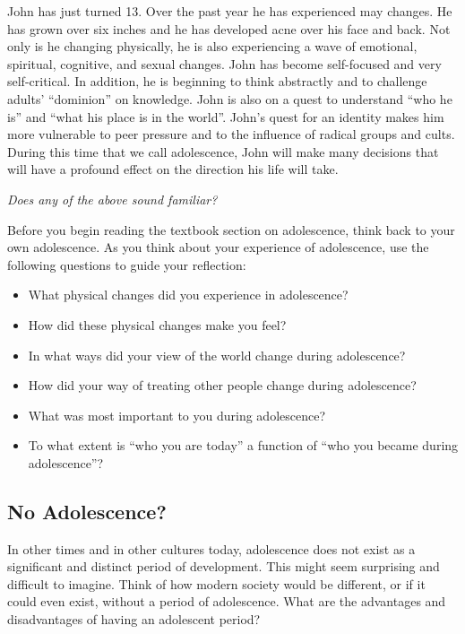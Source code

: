 \documentclass[
]{book}
\providecommand{\tightlist}{%
  \setlength{\itemsep}{0pt}\setlength{\parskip}{0pt}}
\begin{document}
John has just turned 13. Over the past year he has experienced may changes. He has grown over six inches and he has developed acne over his face and back. Not only is he changing physically, he is also experiencing a wave of emotional, spiritual, cognitive, and sexual changes. John has become self-focused and very self-critical. In addition, he is beginning to think abstractly and to challenge adults' ``dominion'' on knowledge. John is also on a quest to understand ``who he is'' and ``what his place is in the world''. John's quest for an identity makes him more vulnerable to peer pressure and to the influence of radical groups and cults. During this time that we call adolescence, John will make many decisions that will have a profound effect on the direction his life will take.

\emph{Does any of the above sound familiar?}

Before you begin reading the textbook section on adolescence, think back to your own adolescence. As you think about your experience of adolescence, use the following questions to guide your reflection:

\begin{itemize}
\tightlist
\item
  What physical changes did you experience in adolescence?\\
\item
  How did these physical changes make you feel?\\
\item
  In what ways did your view of the world change during adolescence?\\
\item
  How did your way of treating other people change during adolescence?\\
\item
  What was most important to you during adolescence?\\
\item
  To what extent is ``who you are today'' a function of ``who you became during adolescence''?
\end{itemize}

\hypertarget{no-adolescence}{%
\subsection*{No Adolescence?}\label{no-adolescence}}

In other times and in other cultures to­day, adolescence does not exist as a significant and distinct period of develop­ment. This might seem surprising and difficult to imagine. Think of how modern society would be different, or if it could even exist, without a period of adolescence. What are the advantages and disadvantages of having an adolescent period?
\end{document}
